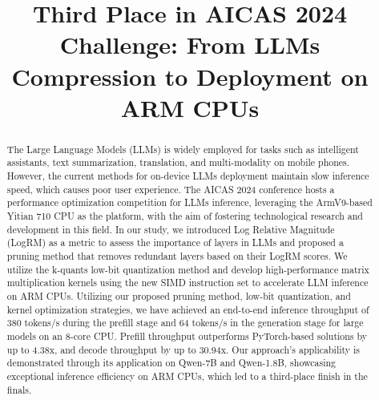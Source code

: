 \documentclass[conference]{IEEEtran}
\begin{document}
\title{Third Place in AICAS 2024  Challenge: From LLMs Compression to Deployment on ARM CPUs \\
}

\author{
\and
\and

}

\maketitle

\begin{abstract}
The Large Language Models (LLMs) is widely employed for tasks such as intelligent assistants, text summarization, translation, and multi-modality on mobile phones. However, the current methods for on-device LLMs deployment maintain slow inference speed, which causes poor user experience. The AICAS 2024 conference hosts a performance optimization competition for LLMs inference, leveraging the ArmV9-based Yitian 710 CPU as the platform, with the aim of fostering technological research and development in this field. In our study, we introduced Log Relative Magnitude (LogRM) as a metric to assess the importance of layers in LLMs and proposed a pruning method that removes redundant layers based on their LogRM scores. We utilize the k-quants low-bit quantization method and develop high-performance matrix multiplication kernels using the new SIMD instruction set to accelerate LLM inference on ARM CPUs. Utilizing our proposed pruning method, low-bit quantization, and kernel optimization strategies, we have achieved an end-to-end inference throughput of 380 tokens/s during the prefill stage and 64 tokens/s in the generation stage for large models on an 8-core CPU. Prefill throughput outperforms PyTorch-based solutions by up to 4.38x, and decode throughput by up to 30.94x. Our approach's applicability is demonstrated through its application on Qwen-7B and Qwen-1.8B, showcasing exceptional inference efficiency on ARM CPUs, which led to a third-place finish in the finals. 
\end{abstract}
\end{document}
